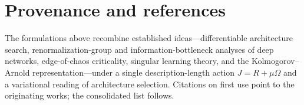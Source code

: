 \documentclass[11pt]{article}
\theoremstyle{definition}
\begin{document}
\section{Provenance and references}
The formulations above recombine established ideas---differentiable architecture search, renormalization-group
and information-bottleneck analyses of deep networks, edge-of-chaos criticality, singular learning theory,
and the Kolmogorov--Arnold representation---under a single description-length action $J=R+\mu\Omega$ and a
variational reading of architecture selection. Citations on first use point to the originating works; the
consolidated list follows.



\end{document}

